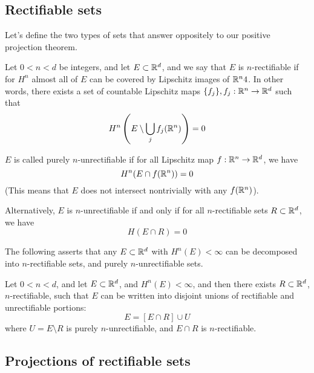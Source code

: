 \subsection{Rectifiable sets}
Let's define the two types of sets that answer oppositely to our positive projection theorem.
\begin{definition}[rectifiable]
    Let $0<n<d$ be integers, and let $E\subset\mathbb{R}^d$, and we say that $E$ is $n$-rectifiable if for $H^n$ almost all of $E$ can be covered by Lipschitz images of $\mathbb{R}^n4$. In other words, there exists a set of countable Lipschitz maps $\{f_j\}, f_j:\mathbb{R}^n\to\mathbb{R}^d$ such that
    \begin{equation*}
        H^n\left( E\setminus \bigcup_jf_j(\mathbb{R}^n)\right)=0
    \end{equation*}
\end{definition}
\begin{definition}[n-unrectifiable]
    $E$ is called purely $n$-unrectifiable if for all Lipschitz map $f:\mathbb{R}^n\to\mathbb{R}^d$, we have
    \begin{equation*}
        H^n(E\cap f(\mathbb{R}^n))=0
    \end{equation*}
    (This means that $E$ does not intersect nontrivially with any $f(\mathbb{R}^n)$). 

    Alternatively, $E$ is $n$-unrectifiable if and only if for all $n$-rectifiable sets $R\subset\mathbb{R}^d$, we have
    \begin{equation*}
        H(E\cap R)=0
    \end{equation*}
\end{definition}
The following asserts that any $E\subset\mathbb{R}^d$ with $H^n(E)<\infty$ can be decomposed into $n$-rectifiable sets, and purely $n$-unrectifiable sets.
\begin{theorem}
    Let $0<n<d$, and let $E\subset\mathbb{R}^d$, and $H^n(E)<\infty$, and then there exists $R\subset\mathbb{R}^d$, $n$-rectifiable, such that $E$ can be written into disjoint unions of rectifiable and unrectifiable portions:
    \begin{equation*}
        E=[E\cap R]\cup U
    \end{equation*}
    where $U=E\setminus R$ is purely $n$-unrectifiable, and $E\cap R$ is $n$-rectifiable.
\end{theorem}



\subsection{Projections of rectifiable sets}





